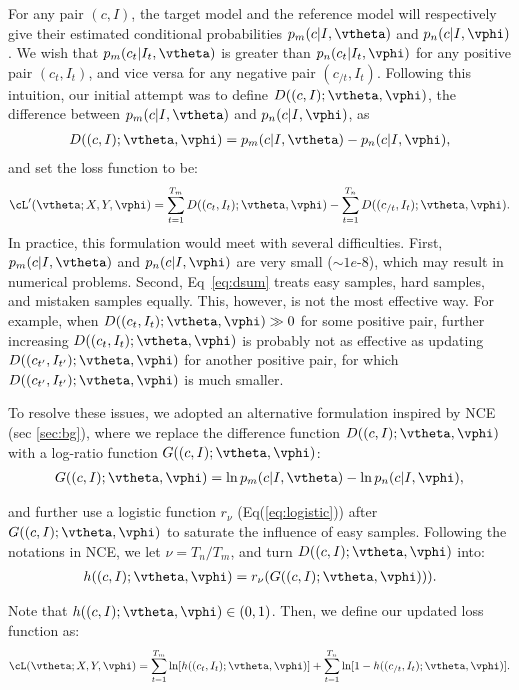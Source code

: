 For any pair $(c,I)$,
the target model and the reference model will respectively give
their estimated conditional probabilities $p_m(c|I,\vtheta)$ and $p_n(c|I,\vphi)$.
We wish that $p_m(c_t|I_t, \vtheta)$ is greater than $p_n(c_t|I_t, \vphi)$ for any positive pair $(c_t, I_t)$,
and vice versa for any negative pair $(c_{/t}, I_t)$.
Following this intuition, our initial attempt was to
define $D((c,I);\vtheta, \vphi)$, the difference between $p_m(c|I, \vtheta)$ and $p_n(c|I, \vphi)$, as
\begin{align}
	D((c,I);\vtheta, \vphi) = p_m(c|I, \vtheta) - p_n(c|I, \vphi),
\end{align}
and set the loss function to be:
\begin{align}
	\cL^\prime(\vtheta;X, Y, \vphi) =
	\sum^{T_m}_{t = 1} D((c_t, I_t);\vtheta, \vphi)
	- \sum^{T_n}_{t = 1} D((c_{/t}, I_t);\vtheta, \vphi)
	\label{eq:dsum}.
\end{align}
In practice, this formulation would meet with several difficulties.
First,
$p_m(c|I, \vtheta)$ and $p_n(c|I, \vphi)$ are very small ($\sim 1e$-$8$),
which may result in numerical problems.
Second,
Eq~\eqref{eq:dsum} treats easy samples,
hard samples, and mistaken samples equally.
This, however, is not the most effective way.
For example, when $D((c_t, I_t);\vtheta, \vphi) \gg 0$ for some positive pair,
further increasing $D((c_t, I_t);\vtheta, \vphi)$
is probably not as effective as updating $D((c_{t^\prime}, I_{t^\prime});\vtheta,\vphi)$
for another positive pair,
for which $D((c_{t^\prime}, I_{t^\prime});\vtheta,\vphi)$ is much smaller.

To resolve these issues, we adopted an alternative formulation
inspired by NCE (sec \ref{sec:bg}), where
we replace the difference function $D((c, I);\vtheta, \vphi)$
with a log-ratio function $G((c,I);\vtheta, \vphi)$:
\begin{align}
	G((c,I);\vtheta, \vphi) = \ln p_m(c|I, \vtheta) - \ln p_n(c|I, \vphi),
\end{align}

and further use a logistic function $r_\nu$ (Eq(\ref{eq:logistic})) after $G((c,I);\vtheta, \vphi)$ to saturate the influence of easy samples.
Following the notations in NCE, we let $\nu = T_n / T_m$,
and turn $D((c, I);\vtheta, \vphi)$ into:
\begin{align}
	h((c,I);\vtheta, \vphi) = r_\nu(G((c,I);\vtheta, \vphi))).
\end{align}

Note that $h((c,I);\vtheta, \vphi) \in (0, 1)$. Then, we define our updated loss function as:
\begin{align}
	\cL(\vtheta;X,Y,\vphi) = \sum^{T_m}_{t = 1} \ln[h((c_t,I_t);\vtheta,\vphi)] + \sum^{T_n}_{t = 1}\ln[1 - h((c_{/t},I_t); \vtheta, \vphi)] \label{eq:hsum}.
\end{align}

